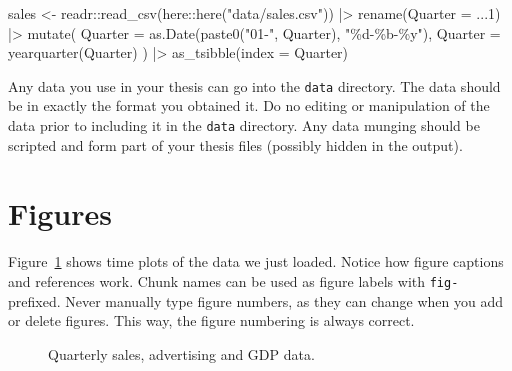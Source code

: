 \documentclass[
  11pt,
  a4paper,
  nottoc]{report}
\newenvironment{Shaded}{}{}
\newcommand{\AttributeTok}[1]{\textcolor[rgb]{0.84,0.23,0.29}{#1}}
\newcommand{\FunctionTok}[1]{\textcolor[rgb]{0.44,0.26,0.76}{#1}}
\newcommand{\NormalTok}[1]{\textcolor[rgb]{0.14,0.16,0.18}{#1}}
\newcommand{\OtherTok}[1]{\textcolor[rgb]{0.44,0.26,0.76}{#1}}
\newcommand{\SpecialCharTok}[1]{\textcolor[rgb]{0.00,0.36,0.77}{#1}}
\newcommand{\StringTok}[1]{\textcolor[rgb]{0.01,0.18,0.38}{#1}}
\begin{document}
\begin{Shaded}
\begin{Highlighting}[]
\NormalTok{sales }\OtherTok{\textless{}{-}}\NormalTok{ readr}\SpecialCharTok{::}\FunctionTok{read\_csv}\NormalTok{(here}\SpecialCharTok{::}\FunctionTok{here}\NormalTok{(}\StringTok{"data/sales.csv"}\NormalTok{)) }\SpecialCharTok{|\textgreater{}}
  \FunctionTok{rename}\NormalTok{(}\AttributeTok{Quarter =} \StringTok{\textasciigrave{}}\AttributeTok{...1}\StringTok{\textasciigrave{}}\NormalTok{) }\SpecialCharTok{|\textgreater{}}
  \FunctionTok{mutate}\NormalTok{(}
    \AttributeTok{Quarter =} \FunctionTok{as.Date}\NormalTok{(}\FunctionTok{paste0}\NormalTok{(}\StringTok{"01{-}"}\NormalTok{, Quarter), }\StringTok{"\%d{-}\%b{-}\%y"}\NormalTok{),}
    \AttributeTok{Quarter =} \FunctionTok{yearquarter}\NormalTok{(Quarter)}
\NormalTok{  ) }\SpecialCharTok{|\textgreater{}}
  \FunctionTok{as\_tsibble}\NormalTok{(}\AttributeTok{index =}\NormalTok{ Quarter)}
\end{Highlighting}
\end{Shaded}

Any data you use in your thesis can go into the \texttt{data} directory.
The data should be in exactly the format you obtained it. Do no editing
or manipulation of the data prior to including it in the \texttt{data}
directory. Any data munging should be scripted and form part of your
thesis files (possibly hidden in the output).

\section{Figures}\label{figures}

Figure~\ref{fig-deaths} shows time plots of the data we just loaded.
Notice how figure captions and references work. Chunk names can be used
as figure labels with \texttt{fig-} prefixed. Never manually type figure
numbers, as they can change when you add or delete figures. This way,
the figure numbering is always correct.

\begin{figure}


\caption{\label{fig-deaths}Quarterly sales, advertising and GDP data.}

\end{figure}%
\end{document}
